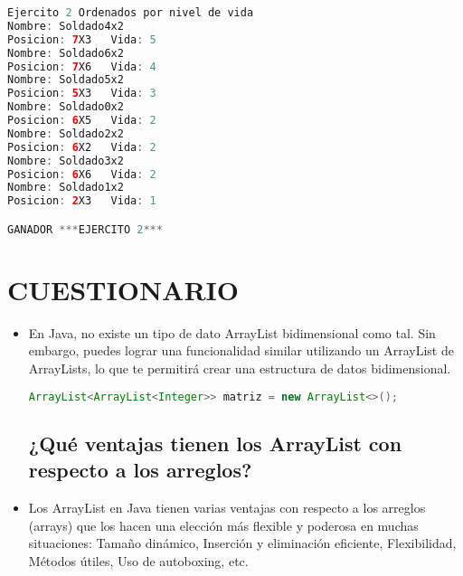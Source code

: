 \documentclass{article}
\begin{document}
\begin{itemize}
\begin{itemize}
\begin{lstlisting}[language=java]
Ejercito 2 Ordenados por nivel de vida
Nombre: Soldado4x2
Posicion: 7X3   Vida: 5
Nombre: Soldado6x2
Posicion: 7X6   Vida: 4
Nombre: Soldado5x2
Posicion: 5X3   Vida: 3
Nombre: Soldado0x2
Posicion: 6X5   Vida: 2
Nombre: Soldado2x2
Posicion: 6X2   Vida: 2
Nombre: Soldado3x2
Posicion: 6X6   Vida: 2
Nombre: Soldado1x2
Posicion: 2X3   Vida: 1

GANADOR ***EJERCITO 2***
         \end{lstlisting}
 
    \section{CUESTIONARIO}

	\begin{itemize}
	\subsection {¿Cómo se declara e inicializa un ArrayList bidimensional?}
        \item En Java, no existe un tipo de dato ArrayList bidimensional como tal. Sin embargo, puedes lograr una funcionalidad similar utilizando un ArrayList de ArrayLists, lo que te permitirá crear una estructura de datos bidimensional.
        \begin{lstlisting}[language=java]
        ArrayList<ArrayList<Integer>> matriz = new ArrayList<>();
        \end{lstlisting}
		
    \subsection {¿Qué ventajas tienen los ArrayList con respecto a los arreglos?}
        \item Los ArrayList en Java tienen varias ventajas con respecto a los arreglos (arrays) que los hacen una elección más flexible y poderosa en muchas situaciones: Tamaño dinámico, Inserción y eliminación eficiente, Flexibilidad, Métodos útiles, Uso de autoboxing, etc.


\end{itemize}
\end{itemize}
\end{itemize}
\end{document}
